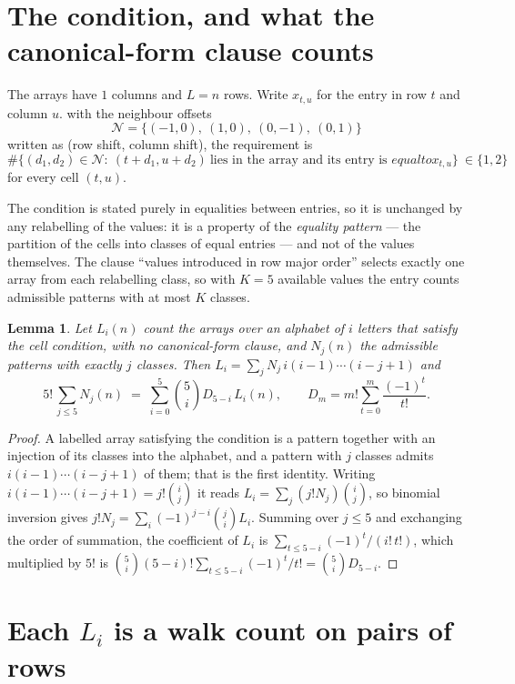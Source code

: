 \documentclass[11pt,a4paper]{article}
\theoremstyle{plain}
\newtheorem{lemma}[theorem]{Lemma}
\theoremstyle{definition}
\begin{document}
\section{The condition, and what the canonical-form clause counts}

The arrays have $1$ columns and $L=n$ rows. Write $x_{t,u}$ for the entry in
row $t$ and column $u$. with the neighbour offsets
\[
\mathcal N=\{(-1,0),\ (1,0),\ (0,-1),\ (0,1)\}
\]
written as (row shift, column shift), the requirement is
\begin{equation}\label{eq:loc}
\#\bigl\{(d_1,d_2)\in\mathcal N:\ (t+d_1,u+d_2)\ \text{lies in the array and its entry is }
equal to x_{t,u}\bigr\}\ \in\{1,2\}
\end{equation}
for every cell $(t,u)$.

The condition is stated purely in equalities between entries, so it is unchanged by any
relabelling of the values: it is a property of the \emph{equality pattern} --- the partition
of the cells into classes of equal entries --- and not of the values themselves. The clause
``values introduced in row major order'' selects exactly one array from each relabelling
class, so with $K=5$ available values the entry counts admissible patterns with at most $K$
classes.

\begin{lemma}\label{lem:inv}
Let $L_i(n)$ count the arrays over an alphabet of $i$ letters that satisfy the cell
condition, with no canonical-form clause, and $N_j(n)$ the admissible patterns with exactly
$j$ classes. Then $L_i=\sum_j N_j\,i(i-1)\cdots(i-j+1)$ and
\[
5!\,\sum_{j\le 5}N_j(n)\;=\;\sum_{i=0}^{5}\binom{5}{i}D_{5-i}\,L_i(n),
\qquad D_m=m!\sum_{t=0}^{m}\frac{(-1)^t}{t!} .
\]
\end{lemma}

\begin{proof}
A labelled array satisfying the condition is a pattern together with an injection of its
classes into the alphabet, and a pattern with $j$ classes admits $i(i-1)\cdots(i-j+1)$ of
them; that is the first identity. Writing $i(i-1)\cdots(i-j+1)=j!\binom{i}{j}$ it reads
$L_i=\sum_j(j!N_j)\binom{i}{j}$, so binomial inversion gives
$j!N_j=\sum_i(-1)^{j-i}\binom{j}{i}L_i$. Summing over $j\le5$ and exchanging the
order of summation, the coefficient of $L_i$ is
$\sum_{t\le5-i}(-1)^t/(i!\,t!)$, which multiplied by $5!$ is
$\binom{5}{i}(5-i)!\sum_{t\le5-i}(-1)^t/t!=\binom{5}{i}D_{5-i}$.
\end{proof}

\section{Each $L_i$ is a walk count on pairs of rows}
\end{document}
